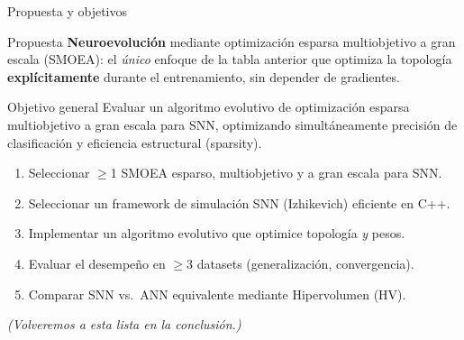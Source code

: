 \documentclass[aspectratio=169,10pt]{beamer}
\begin{document}
\begin{frame}{Propuesta y objetivos}
  \begin{block}{Propuesta}
    \small \textbf{Neuroevolución} mediante optimización esparsa multiobjetivo a gran escala (SMOEA): el \emph{único} enfoque de la tabla anterior que optimiza la topología \textbf{explícitamente} durante el entrenamiento, sin depender de gradientes.
  \end{block}
  \begin{exampleblock}{Objetivo general}
    \small Evaluar un algoritmo evolutivo de optimización esparsa multiobjetivo a gran escala para SNN, optimizando simultáneamente precisión de clasificación y eficiencia estructural (sparsity).
  \end{exampleblock}
  \small
  \begin{enumerate}
    \item Seleccionar $\geq$1 SMOEA esparso, multiobjetivo y a gran escala para SNN.
    \item Seleccionar un framework de simulación SNN (Izhikevich) eficiente en C++.
    \item Implementar un algoritmo evolutivo que optimice topología \emph{y} pesos.
    \item Evaluar el desempeño en $\geq$3 datasets (generalización, convergencia).
    \item Comparar SNN vs.\ ANN equivalente mediante Hipervolumen (HV).
  \end{enumerate}
  \vspace{2pt}
  \centering\footnotesize\textit{(Volveremos a esta lista en la conclusión.)}
\end{frame}

\end{document}
